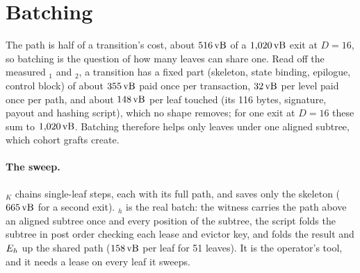 \section{Batching}\label{sec:batching}

The path is half of a transition's cost, about $516\,\mathrm{vB}$ of a $1{,}020\,\mathrm{vB}$
exit at $D = 16$, so batching is the question of how many leaves can
share one. Read off the measured $_1$ and $_2$, a
transition has a fixed part (skeleton, state binding, epilogue, control
block) of about $355\,\mathrm{vB}$ paid once per transaction, $32\,\mathrm{vB}$ per level
paid once per path, and about $148\,\mathrm{vB}$ per leaf touched (its 116 bytes,
signature, payout and hashing script), which no shape removes; for one
exit at $D = 16$ these sum to $1{,}020\,\mathrm{vB}$.
Batching therefore helps only leaves under one aligned subtree, which
cohort grafts create.

\paragraph{The sweep.} $_K$ chains single-leaf steps, each
with its full path, and saves only the skeleton ($665\,\mathrm{vB}$ for a second
exit). $_h$ is the real batch: the witness carries the
path above an aligned subtree once and every position of the subtree,
the script folds the subtree in post order checking each lease and
evictor key, and folds the result and $E_h$ up the shared path
($158\,\mathrm{vB}$ per leaf for 51 leaves). It is the operator's tool, and it
needs a lease on every leaf it sweeps.


